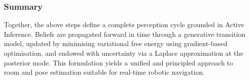 \documentclass[a4paper, twoside]{article}
\begin{document}
\subsubsection{Summary}
\label{sec:room-summary}

Together, the above steps define a complete perception cycle grounded in Active
Inference. Beliefs are propagated forward in time through a generative transition
model, updated by minimising variational free energy using gradient-based
optimisation, and endowed with uncertainty via a Laplace approximation at the
posterior mode. This formulation yields a unified and principled approach to room
and pose estimation suitable for real-time robotic navigation.







\end{document}
